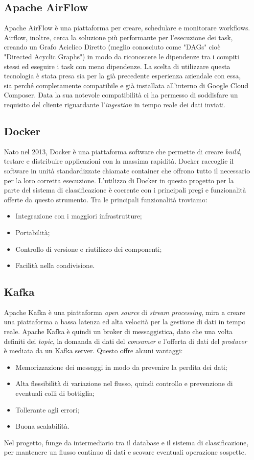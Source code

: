 \subsection{Apache AirFlow}
Apache AirFlow è una piattaforma per creare, schedulare e monitorare \gls{workflows}. Airflow, inoltre, cerca la soluzione più performante per l'esecuzione dei task, creando un Grafo Aciclico Diretto (meglio conosciuto come "\gls{DAGs}" cioè "Directed Acyclic Graphs") in modo da riconoscere le dipendenze tra i compiti stessi ed eseguire i task con meno dipendenze.
La scelta di utilizzare questa tecnologia è stata presa sia per la già precedente esperienza aziendale con essa, sia perché completamente compatibile e già installata all'interno di Google Cloud Composer. Data la sua notevole compatibilità ci ha permesso di soddisfare un requisito del cliente riguardante l'\emph{ingestion} in tempo reale dei dati inviati.
\subsection{Docker}
Nato nel 2013, Docker è una piattaforma software che permette di creare \emph{build}, testare e distribuire applicazioni con la massima rapidità. Docker raccoglie il software in unità standardizzate chiamate container che offrono tutto il necessario per la loro corretta esecuzione. L'utilizzo di Docker in questo progetto per la parte del sistema di classificazione è coerente con i principali pregi e funzionalità offerte da questo strumento.
Tra le principali funzionalità troviamo:
\begin{itemize}
	\item Integrazione con i maggiori infrastrutture;
	\item Portabilità;
	\item Controllo di versione e riutilizzo dei componenti;
	\item Facilità nella condivisione.
\end{itemize}
\subsection{Kafka}
Apache Kafka è una piattaforma \emph{open source} di \emph{stream processing}, mira a creare una piattaforma a bassa latenza ed alta velocità per la gestione di dati in tempo reale.
Apache Kafka è quindi un broker di messaggistica, dato che una volta definiti dei \emph{topic}, la domanda di dati del \emph{consumer} e l'offerta di dati del \emph{producer} è mediata da un Kafka server. Questo offre alcuni vantaggi:
\begin{itemize}
	\item Memorizzazione dei messaggi in modo da prevenire la perdita dei dati;
	\item Alta flessibilità di variazione nel flusso, quindi controllo e prevenzione di eventuali colli di bottiglia;
	\item Tollerante agli errori;
	\item Buona scalabilità.
\end{itemize}
Nel progetto, funge da intermediario tra il database e il sistema di classificazione, per mantenere un flusso continuo di dati e scovare eventuali operazione sospette.
